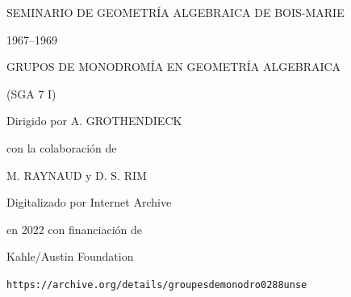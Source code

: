 \begin{center}
SEMINARIO DE GEOMETRÍA ALGEBRAICA DE BOIS-MARIE

1967--1969

\bigskip
GRUPOS DE MONODROMÍA EN GEOMETRÍA ALGEBRAICA

(SGA 7 I)

\bigskip
Dirigido por A. GROTHENDIECK

con la colaboración de

M. RAYNAUD y D. S. RIM
\end{center}
\clearpage

\begin{center}
Digitalizado por Internet Archive

en 2022 con financiación de

Kahle/Austin Foundation

\bigskip
\texttt{https://archive.org/details/groupesdemonodro0288unse}
\end{center}
\clearpage

